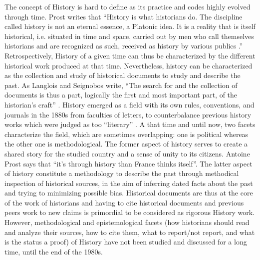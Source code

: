 The concept of History is hard to define as its practice and codes highly evolved through time.
Prost writes that ``History is what historians do. The discipline called history is not an eternal essence, a Platonic idea. It is a reality that is itself historical, i.e. situated in time and space, carried out by men who call themselves historians and are recognized as such, received as history by various publics \cite{prost2014}.''
Retrospectively, History of a given time can thus be characterized by the different historical work produced at that time.
Nevertheless, history can be characterized as the collection and study of historical documents to study and describe the past.
As Langlois and Seignobos write, ``The search for and the collection of documents is thus a part, logically the first and most important part, of the historian's craft'' \cite{langloisIntroductionAuxEtudes2014}.
History emerged as a field with its own rules, conventions, and journals in the 1880s from faculties of letters, to counterbalance previous history works which were judged as too ``literary'' \cite{noirielNaissanceMetierHistorien1990}.
A that time and until now, two facets characterize the field, which are sometimes overlapping: one is political whereas the other one is methodological.
The former aspect of history serves to create a shared story for the studied country and a sense of unity to its citizens.
Antoine Prost says that ``it's through history than France thinks itself''\cite{prost2014}.
The latter aspect of history constitute a methodology to describe the past through methodical inspection of historical sources, in the aim of inferring dated facts about the past and trying to minimizing possible bias.
Historical documents are thus at the core of the work of historians and having to cite historical documents and previous peers work to new claims is primordial to be considered as rigorous History work.
However, methodological and epistemological facets (how historians should read and analyze their sources, how to cite them, what to report/not report, and what is the status a proof) of History have not been studied and discussed for a long time, until the end of the 1980s.
